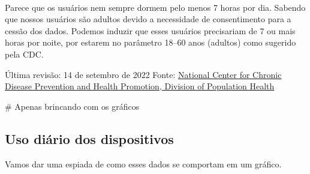 \documentclass[11pt]{article}
\begin{document}
\begin{center}
\end{center}
{ \hspace*{\fill} \\}

Parece que os usuários nem sempre dormem pelo menos 7 horas por dia.
Sabendo que nossos usuários são adultos devido a necessidade de
consentimento para a cessão dos dados. Podemos induzir que esses
usuários precisariam de 7 ou mais horas por noite, por estarem no
parâmetro 18--60 anos (adultos) como sugerido pela CDC.

Última revisão: 14 de setembro de 2022 Fonte:
\href{https://www.cdc.gov/sleep/about_sleep/how_much_sleep.html}{National
    Center for Chronic Disease Prevention and Health Promotion, Division of
    Population Health}

\# Apenas brincando com os gráficos

\hypertarget{uso-diuxe1rio-dos-dispositivos}{%
    \subsection{Uso diário dos
        dispositivos}\label{uso-diuxe1rio-dos-dispositivos}}

Vamos dar uma espiada de como esses dados se comportam em um gráfico.
\end{document}
